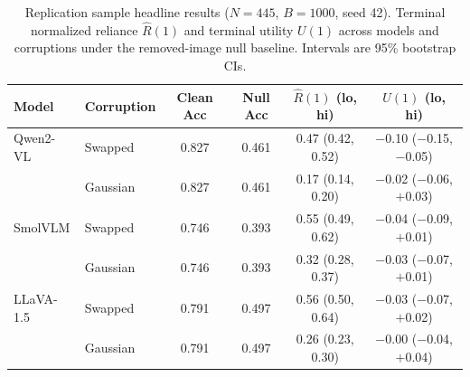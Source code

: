 \begin{table}[t]
\centering
\caption{Replication sample headline results ($N=445$, $B=1000$, seed 42).
  Terminal normalized reliance $\hat{R}(1)$ and terminal utility $U(1)$
  across models and corruptions under the removed-image null baseline.
  Intervals are 95\% bootstrap CIs.}
\label{tab:replication}
{\footnotesize\setlength{\tabcolsep}{3pt}%
\begin{tabular}{llcccc}
\toprule
\textbf{Model} & \textbf{Corruption} & Clean Acc & Null Acc & $\hat{R}(1)$ (lo, hi) & $U(1)$ (lo, hi) \\
\midrule
Qwen2-VL  & Swapped  & 0.827 & 0.461 & 0.47 (0.42, 0.52) & $-$0.10 ($-$0.15, $-$0.05) \\
          & Gaussian & 0.827 & 0.461 & 0.17 (0.14, 0.20) & $-$0.02 ($-$0.06, $+$0.03) \\
SmolVLM   & Swapped  & 0.746 & 0.393 & 0.55 (0.49, 0.62) & $-$0.04 ($-$0.09, $+$0.01) \\
          & Gaussian & 0.746 & 0.393 & 0.32 (0.28, 0.37) & $-$0.03 ($-$0.07, $+$0.01) \\
LLaVA-1.5 & Swapped  & 0.791 & 0.497 & 0.56 (0.50, 0.64) & $-$0.03 ($-$0.07, $+$0.02) \\
           & Gaussian & 0.791 & 0.497 & 0.26 (0.23, 0.30) & $-$0.00 ($-$0.04, $+$0.04) \\
\bottomrule
\end{tabular}}
\end{table}
